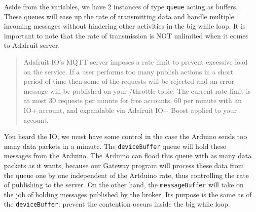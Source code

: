 Aside from the variables, we have 2 instances of type \texttt{queue} acting as buffers. These queues will ease up the rate of transmitting data and handle multiple incoming messages without hindering other activities in the big while loop. It is important to note that the rate of transmission is NOT unlimited when it comes to Adafruit server:
\begin{quote}
    Adafruit IO's MQTT server imposes a rate limit to prevent excessive load on the service. If a user performs too many publish actions in a short period of time then some of the requests will be rejected and an error message will be published on your /throttle topic. The current rate limit is at most 30 requests per minute for free accounts, 60 per minute with an IO+ account, and expandable via Adafruit IO+ Boost applied to your account.
\end{quote}
You heard the IO, we must have some control in the case the Arduino sends too many data packets in a mimute. The \texttt{deviceBuffer} queue will hold these messages from the Arduino. The Arduino can flood this queue with as many data packets as it wants, because our Gateway program will process these data from the queue one by one independent of the Artduino rate, thus controlling the rate of publishing to the server. On the other hand, the \texttt{messageBuffer} will take on the job of holding messages published by the broker. Its purpose is the same as of the \texttt{deviceBuffer}: prevent the contention occurs inside the big while loop.

